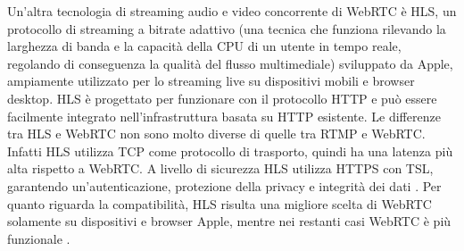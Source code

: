 \documentclass[11pt, a4paper, openany]{book}
\begin{document}
  	Un'altra tecnologia di streaming audio e video concorrente di WebRTC è HLS, un protocollo di streaming a bitrate adattivo (una tecnica che funziona rilevando la larghezza di banda e la capacità della CPU di un utente in tempo reale, regolando di conseguenza la qualità del flusso multimediale) sviluppato da Apple, ampiamente utilizzato per lo streaming live su dispositivi mobili e browser desktop. HLS è progettato per funzionare con il protocollo HTTP e può essere facilmente integrato nell'infrastruttura basata su HTTP esistente. Le differenze tra HLS e WebRTC non sono molto diverse di quelle tra RTMP e WebRTC. Infatti HLS utilizza TCP come protocollo di trasporto, quindi ha una latenza più alta rispetto a WebRTC. A livello di sicurezza HLS utilizza HTTPS con TSL, garantendo un'autenticazione, protezione della privacy e integrità dei dati \cite{44}. Per quanto riguarda la compatibilità, HLS risulta una migliore scelta di WebRTC solamente su dispositivi e browser Apple, mentre nei restanti casi WebRTC è più funzionale \cite{45}.
  	
  	\newpage
\end{document}
